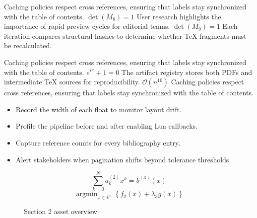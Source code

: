     Caching policies respect cross references, ensuring that labels stay synchronized with the table of contents.  $\det(M_{8}) = 1$  User research highlights the importance of rapid preview cycles for editorial teams.  $\det(M_{9}) = 1$  Each iteration compares structural hashes to determine whether TeX fragments must be recalculated.
    \par
  
    Caching policies respect cross references, ensuring that labels stay synchronized with the table of contents.  $e^{i\pi} + 1 = 0$  The artifact registry stores both PDFs and intermediate TeX sources for reproducibility.  $\mathcal{O}(n^{10})$  Caching policies respect cross references, ensuring that labels stay synchronized with the table of contents.
    \par
  
    \begin{itemize}
      
    \item Record the width of each float to monitor layout drift.
    \item Profile the pipeline before and after enabling Lua callbacks.
    \item Capture reference counts for every bibliography entry.
    \item Alert stakeholders when pagination shifts beyond tolerance thresholds.
    \end{itemize}
\begin{equation}
\label{eq:sec2-eq1}
\sum_{k=0}^{N} a_k^{(2)} x^k = b^{(3)}(x)
\end{equation}
\[
\operatorname{argmin}_{x \in \mathbb{R}^{n}} \left\{ f_{2}(x) + \lambda_{3} g(x) \right\}
\]

    \begin{figure}[htbp]
      \centering
        \caption{Section 2 asset overview}
      
        \label{fig:fig-sec2}
      
    \end{figure}
  
